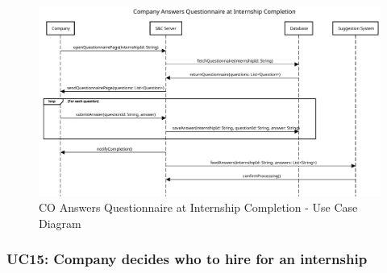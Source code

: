 \begin{figure}[H]
    \centering
    \includegraphics[width=1.0\textwidth]{Images/UC_14.pdf}
    \caption{CO Answers Questionnaire at Internship Completion - Use Case Diagram}
    \label{fig:use-case-diagram-14}
\end{figure}

\pagebreak


\subsubsection{UC15: Company decides who to hire for an internship}
\label{subsubsec:company-decides-who-to-hire-for-an-internship}

